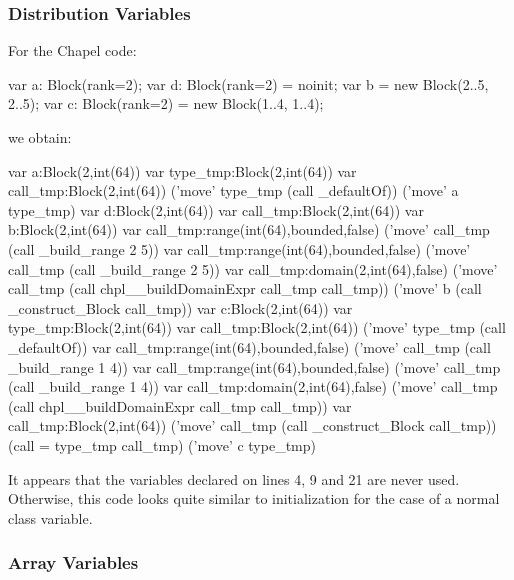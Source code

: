 \subsubsection{Distribution Variables}

For the Chapel code:
\begin{chapel}
var a: Block(rank=2);
var d: Block(rank=2) = noinit;
var b = new Block({2..5, 2..5});
var c: Block(rank=2) = new Block({1..4, 1..4});
\end{chapel}
\noindent
we obtain:
\begin{numberedchapel}
    var a:Block(2,int(64))
    {
      var type_tmp:Block(2,int(64))
      var call_tmp:Block(2,int(64))
      ('move' type_tmp (call _defaultOf))
      ('move' a type_tmp)
    }
    var d:Block(2,int(64))
    var call_tmp:Block(2,int(64))
    var b:Block(2,int(64))
    var call_tmp:range(int(64),bounded,false)
    ('move' call_tmp (call _build_range 2 5))
    var call_tmp:range(int(64),bounded,false)
    ('move' call_tmp (call _build_range 2 5))
    var call_tmp:domain(2,int(64),false)
    ('move' call_tmp (call chpl__buildDomainExpr call_tmp call_tmp))
    ('move' b (call _construct_Block call_tmp))
    var c:Block(2,int(64))
    {
      var type_tmp:Block(2,int(64))
      var call_tmp:Block(2,int(64))
      ('move' type_tmp (call _defaultOf))
      var call_tmp:range(int(64),bounded,false)
      ('move' call_tmp (call _build_range 1 4))
      var call_tmp:range(int(64),bounded,false)
      ('move' call_tmp (call _build_range 1 4))
      var call_tmp:domain(2,int(64),false)
      ('move' call_tmp (call chpl__buildDomainExpr call_tmp call_tmp))
      var call_tmp:Block(2,int(64))
      ('move' call_tmp (call _construct_Block call_tmp))
      (call = type_tmp call_tmp)
      ('move' c type_tmp)
    }
\end{numberedchapel}
\noindent
It appears that the  variables declared on lines 4, 9 and 21 are never
used.  Otherwise, this code looks quite similar to initialization for the case of a normal
class variable.

\subsubsection{Array Variables}

